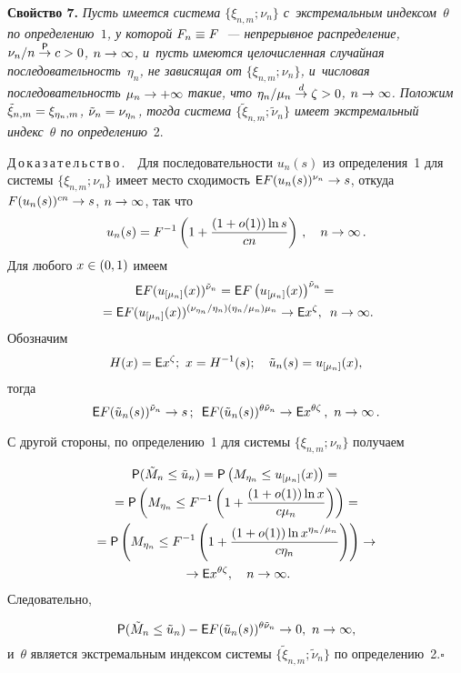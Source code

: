 \begin{multicols}{2}
\smallskip

\noindent
\textbf{Свойство 7.} \textit{Пусть имеется система $\{\xi_{n,m};\nu_n\}$
с~экстремальным индексом~$\theta$ по определению~$1$,
у которой $F_n\hm\equiv F$~--- непрерывное распределение,
$\nu_n/n\stackrel{{\sf P}}{\to} c\hm>0$, $n\hm\to\infty$,
и~пусть имеются целочисленная случайная
последовательность~$\eta_n$, не зависящая от $\{\xi_{n,m};\nu_n\}$,
и~числовая последовательность $\mu_n\hm\to +\infty$ такие, что
$\eta_n/\mu_n\stackrel{d}{\to}\zeta\hm>0$, $n\hm\to\infty$.
Положим ${\tilde\xi}_{n,m}\hm=\xi_{\eta_n,m}$,
${\tilde\nu_n}\hm=\nu_{\eta_n}$, тогда система
$\{{\tilde\xi}_{n,m};{\tilde\nu}_n\}$ имеет экстремальный
индекс~$\theta$ по определению}~2.

\noindent
Д\,о\,к\,а\,з\,а\,т\,е\,л\,ь\,с\,т\,в\,о\,.\ \
Для последовательности $u_n(s)$ из определения~1 для системы $\{\xi_{n,m};\nu_n\}$
имеет место сходимость ${\sf E}F(u_n(s))^{\nu_n}\hm\to s$,
откуда $F(u_n(s))^{cn}\hm\to s$, $n\hm\to\infty$, так что
$$
u_n(s)=F^{-1}\left(1+\displaystyle\frac{\displaystyle (1+o(1))\ln s\mathstrut}{\displaystyle cn\mathstrut}\right)\,,\quad n\to\infty\,.
$$
Для любого $x\hm\in (0,1)$ имеем
\begin{multline*}
{\sf E}F(u_{[\mu_n]}(x))^{{\tilde\nu}_n}={\sf E}F\left(u_{[\mu_n]}(x)\right)^{{\tilde\nu}_n}={}\\
{}={\sf E}F(u_{[\mu_n]}(x))^{(\nu_{\eta_n}/\eta_n)
\left(\eta_n/\mu_n\right)\mu_n}\to {\sf E}x^\zeta,\enskip n\to\infty.
\end{multline*}
Обозначим 
$$
H(x)={\sf E}x^\zeta;\ x=H^{-1}(s);\quad
{\tilde u}_n(s)=u_{[\mu_n]}(x),
$$
тогда
$$
{\sf E}F({\tilde u}_n(s))^{{\tilde\nu}_n}\to s\,;\enskip
{\sf E}F({\tilde u}_n(s))^{\theta{\tilde\nu}_n}\to {\sf E}x^{\theta\zeta}\,,\
n\to\infty\,.
$$


\noindent
С другой стороны, по определению~1 для системы $\{\xi_{n,m};\nu_n\}$ получаем


\noindent
\begin{multline*}
{\sf P}({\tilde M}_n\le{\tilde u}_n)={\sf P}\left(M_{\eta_n}\le u_{[\mu_n]}(x)\right)={}\\
{}={\sf P}\left(M_{\eta_n}\le F^{-1}\left(1+\displaystyle\frac{\displaystyle (1+o(1))\ln x\mathstrut}{\displaystyle c\mu_n\mathstrut}\right)\right)={}\\
{}={\sf P}\left(
M_{\eta_n}\le F^{-1}\left(
1+\displaystyle\frac{\displaystyle (1+o(1))\ln x^{\eta_n/\mu_n}\mathstrut}{\displaystyle c\eta_n\mathstrut}\right)\right)
\to{}\\
{}\to  {\sf E}x^{\theta\zeta},\quad n\to\infty.
\end{multline*}
Следовательно, 

\noindent
$$
{\sf P}({\tilde M}_n \le{\tilde u}_n)-
{\sf E}F({\tilde u}_n(s))^{\theta{\tilde\nu}_n}\to 0,\ n\to\infty,
$$
и~$\theta$ является экстремальным индексом сис\-те\-мы
$\{{\tilde\xi}_{n,m};{\tilde\nu}_n\}$ по определению~2.\hfill$\square$


\end{multicols}
